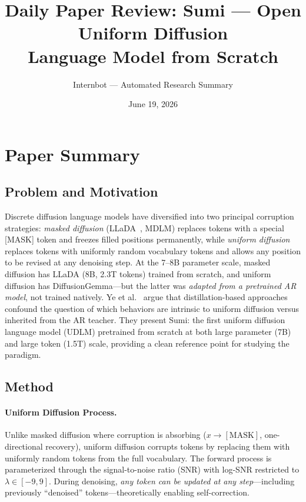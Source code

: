\documentclass[11pt,a4paper]{article}
\title{Daily Paper Review: Sumi --- Open Uniform Diffusion\\Language Model from Scratch}
\author{Internbot --- Automated Research Summary}
\date{June 19, 2026}
\begin{document}
\maketitle

\section{Paper Summary}

\subsection{Problem and Motivation}

Discrete diffusion language models have diversified into two principal corruption strategies: \emph{masked diffusion} (LLaDA~\cite{nie2026llada}, MDLM) replaces tokens with a special [MASK] token and freezes filled positions permanently, while \emph{uniform diffusion} replaces tokens with uniformly random vocabulary tokens and allows any position to be revised at any denoising step. At the 7--8B parameter scale, masked diffusion has LLaDA (8B, 2.3T tokens) trained from scratch, and uniform diffusion has DiffusionGemma---but the latter was \emph{adapted from a pretrained AR model}, not trained natively. Ye et al.~\cite{ye2026sumi} argue that distillation-based approaches confound the question of which behaviors are intrinsic to uniform diffusion versus inherited from the AR teacher. They present Sumi: the first uniform diffusion language model (UDLM) pretrained from scratch at both large parameter (7B) and large token (1.5T) scale, providing a clean reference point for studying the paradigm.

\subsection{Method}

\paragraph{Uniform Diffusion Process.} Unlike masked diffusion where corruption is absorbing ($x \to \mathrm{[MASK]}$, one-directional recovery), uniform diffusion corrupts tokens by replacing them with uniformly random tokens from the full vocabulary. The forward process is parameterized through the signal-to-noise ratio (SNR) with log-SNR restricted to $\lambda \in [-9, 9]$. During denoising, \emph{any token can be updated at any step}---including previously ``denoised'' tokens---theoretically enabling self-correction.
\end{document}
